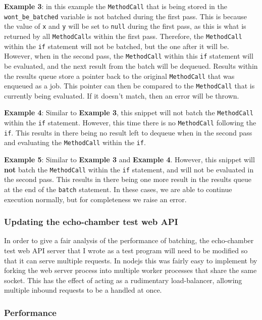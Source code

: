 \textbf{Example 3}: in this example the \verb|MethodCall| that is being stored in the \verb|wont_be_batched| variable is not batched during the first pass. This is because the value of \verb|x| and \verb|y| will be set to \verb|null| during the first pass, as this is what is returned by all \verb|MethodCall|s within the first pass. Therefore, the \verb|MethodCall| within the \verb|if| statement will not be batched, but the one after it will be. However, when in the second pass, the \verb|MethodCall| within this \verb|if| statement will be evaluated, and the next result from the batch will be dequeued. Results within the results queue store a pointer back to the original \verb|MethodCall| that was enqueued as a job. This pointer can then be compared to the \verb|MethodCall| that is currently being evaluated. If it doesn't match, then an error will be thrown.

\textbf{Example 4}: Similar to \textbf{Example 3}, this snippet will not batch the \verb|MethodCall| within the \verb|if| statement. However, this time there is no \verb|MethodCall| following the \verb|if|. This results in there being no result left to dequeue when in the second pass and evaluating the \verb|MethodCall| within the \verb|if|.

\textbf{Example 5}: Similar to \textbf{Example 3} and \textbf{Example 4}. However, this snippet will \textbf{not} batch the \verb|MethodCall| within the \verb|if| statement, and will not be evaluated in the second pass. This results in there being one more result in the results queue at the end of the \verb|batch| statement. In these cases, we are able to continue execution normally, but for completeness we raise an error.

\subsubsection{Updating the echo-chamber test web API}

In order to give a fair analysis of the performance of batching, the echo-chamber test web API server that I wrote as a test program will need to be modified so that it can serve multiple requests. In nodejs this was fairly easy to implement by forking the web server process into multiple worker processes that share the same socket. This has the effect of acting as a rudimentary load-balancer, allowing multiple inbound requests to be a handled at once.

\subsubsection{Performance}


